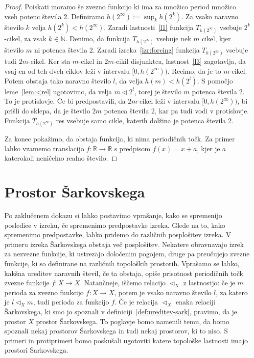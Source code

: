 \documentclass[mat2]{fmfdelo}
\newcommand{\R}{\mathbb R}
\newcommand{\N}{\mathbb N}
\begin{document}
\begin{proof}
Poiskati moramo še zvezno funkcijo ki ima za množico period množico vseh potenc števila 2. Definiramo $h(2^{\infty}) := \sup_k h(2^k)$. Za vsako naravno število $k$ velja $h(2^k) < h(2^{\infty})$. Zaradi lastnosti~\ref{l1} funkcija $T_{h(2^{\infty})}$ vsebuje $2^k$-cikel, za vsak $k \in \N$. 
Denimo, da funkcija $T_{h(2^{\infty})}$ vsebuje nek $m$ cikel, kjer število $m$ ni potenca števila 2. Zaradi izreka~\ref{izr:forcing} funkcija $T_{h(2^{\infty})}$ vsebuje tudi $2m$-cikel. Ker sta $m$-cikel in $2m$-cikil disjunktca, lastnost~\ref{l3} zagotavlja, da vsaj en od teh dveh ciklov leži v intervalu $[0, h(2^{\infty}))$. Recimo, da je to $m$-cikel. Potem obstaja tako naravno število $l$, da velja $h(m) < h(2^l)$. S pomočjo leme~\ref{lem:<rel} ugotovimo, da velja $m \triangleleft 2^l$, torej je število $m$ potenca števila 2. To je protislovje. Če bi predpostavili, da $2m$-cikel leži v intervalu $[0, h(2^{\infty}))$, bi prišli do sklepa, da je število $2m$ potenca števila 2, kar pa tudi vodi v protislovje. Funkcija $T_{h(2^{\infty})}$ res vsebuje samo cikle, katerih dolžina je potenca števila 2.

Za konec pokažimo, da obstaja funkcija, ki nima periodičnih točk. Za primer lahko vzamemo translacijo $f : \R \to \R$ s predpisom $f(x) = x + a$, kjer je $a$ katerokoli neničelno realno število.
\end{proof}

\newpage
\section{Prostor Šarkovskega}
Po zaklučenem dokazu si lahko postavimo vprašanje, kako se spremenijo posledice v izreku, če spremenimo predpostavke izreka. Glede na to, kako spremenimo predpostavke, lahko pridemo do različnih posplošitev izreka. V primeru izreka Šarkovskega obstaja več posplošitev. Nekatere obravnavajo izrek za nezvezne funkcije, ki ustrezajo določenim pogojem, druge pa preučujejo zvezne funkcije, ki so definirane na različnih topoloških prostorih. Vprašamo se lahko, kakšna ureditev naravnih števil, če ta obstaja, opiše prisotnost periodičnih točk zvezne funkcije $f:X \to X$. Natančneje, iščemo relacijo $\triangleleft_X$ z lastnostjo: če je $m$ perioda za zvezno funkcijo $f:X \to X$, potem je vsako naravno število $l$, za katero je $l \triangleleft_X m$, tudi perioda za funkcijo $f$. Če je relacija $\triangleleft_X$ enaka relaciji Šarkovskega, ki smo jo spoznali v definiciji~\ref{def:ureditev-sark}, pravimo, da je prostor $X$ prostor Šarkovskega. To poglavje bomo namenili temu, da bomo spoznali nekaj prostorov Šarkovskega in tudi nekaj prostorov, ki to niso. S primeri in protiprimeri bomo poskušali ugotoviti katere topološke lastnosti imajo prostori Šarkovskega.
\end{document}
